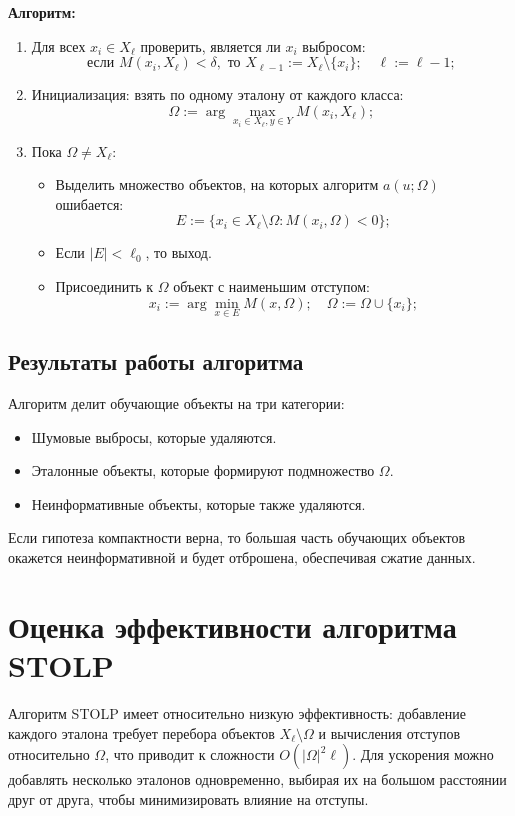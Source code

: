 \textbf{Алгоритм:}
\begin{enumerate}
    \item Для всех \( x_i \in X_\ell \) проверить, является ли \( x_i \) выбросом:
    \[
    \text{если } M(x_i, X_\ell) < \delta, \text{ то } X_{\ell-1} := X_\ell \setminus \{x_i\}; \quad \ell := \ell - 1;
    \]
    \item Инициализация: взять по одному эталону от каждого класса:
    \[
    \Omega := \arg \max_{x_i \in X_\ell, y \in Y} M(x_i, X_\ell);
    \]
    \item Пока \( \Omega \neq X_\ell \):
    \begin{itemize}
        \item Выделить множество объектов, на которых алгоритм \( a(u; \Omega) \) ошибается:
        \[
        E := \{x_i \in X_\ell \setminus \Omega : M(x_i, \Omega) < 0\};
        \]
        \item Если \( |E| < \ell_0 \), то выход.
        \item Присоединить к \( \Omega \) объект с наименьшим отступом:
        \[
        x_i := \arg \min_{x \in E} M(x, \Omega); \quad \Omega := \Omega \cup \{x_i\};
        \]
    \end{itemize}
\end{enumerate}



\subsection*{Результаты работы алгоритма}
Алгоритм делит обучающие объекты на три категории:
\begin{itemize}
    \item Шумовые выбросы, которые удаляются.
    \item Эталонные объекты, которые формируют подмножество $\Omega$.
    \item Неинформативные объекты, которые также удаляются.
\end{itemize}

Если гипотеза компактности верна, то большая часть обучающих объектов окажется неинформативной и будет отброшена, обеспечивая сжатие данных.

\section{Оценка эффективности алгоритма STOLP}
Алгоритм STOLP имеет относительно низкую эффективность: добавление каждого эталона требует перебора объектов \( X_\ell \setminus \Omega \) и вычисления отступов относительно \( \Omega \), что приводит к сложности \( O(|\Omega|^2 \ell) \). Для ускорения можно добавлять несколько эталонов одновременно, выбирая их на большом расстоянии друг от друга, чтобы минимизировать влияние на отступы.

